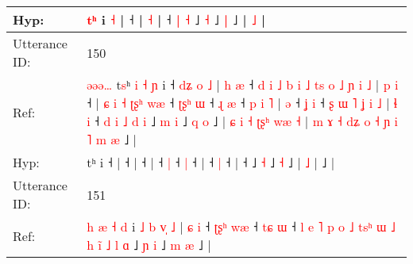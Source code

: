 \documentclass[10pt]{article}
\DeclareRobustCommand{\hl}[1]{{\textcolor{red}{#1}}}
\begin{document}
\begin{longtable}{ll}
Hyp: & \hl{}\hl{}\hl{}\hl{}\hl{}\hl{}\hl{}\hl{}\hl{}\hl{}\hl{}\hl{}\hl{}\hl{t}\hl{ʰ} i \hl{˧} |\hl{}\hl{}\hl{}\hl{} ˧\hl{}\hl{}\hl{}\hl{}\hl{}\hl{} |\hl{}\hl{}\hl{}\hl{}\hl{} \hl{}\hl{˧} |\hl{}\hl{}\hl{}\hl{} ˧ \hl{|} \hl{˧} ˩\hl{}\hl{} \hl{˧} ˩\hl{}\hl{} \hl{|} ˩ |\hl{}\hl{}\hl{}\hl{} \hl{˩} |
 \\
\midrule
Utterance ID: & 150 \\
Ref: & \hl{ə}\hl{ə}\hl{ə}\hl{…}\hl{ }t\hl{s}ʰ\hl{ }\hl{i}\hl{ }\hl{˧}\hl{ }\hl{ɲ} i ˧\hl{ }\hl{d}\hl{ʑ}\hl{ }\hl{o}\hl{ }\hl{˩} |\hl{ }\hl{h}\hl{ }\hl{æ} ˧\hl{ }\hl{d}\hl{ }\hl{i}\hl{ }\hl{˩}\hl{ }\hl{b}\hl{ }\hl{i}\hl{ }\hl{˩}\hl{ }\hl{t}\hl{s}\hl{ }\hl{o}\hl{ }\hl{˩}\hl{ }\hl{ɲ}\hl{ }\hl{i}\hl{ }\hl{˩} |\hl{ }\hl{p}\hl{ }\hl{i} ˧ |\hl{ }\hl{ɕ}\hl{ }\hl{i}\hl{ }\hl{˧}\hl{ }\hl{ʈ}\hl{ʂ}\hl{ʰ}\hl{ }\hl{w}\hl{æ} ˧\hl{ }\hl{ʈ}\hl{ʂ}\hl{ʰ} \hl{ɯ} ˧\hl{ }\hl{ɻ} \hl{æ} ˧\hl{ }\hl{p}\hl{ }\hl{i}\hl{ }\hl{˥} |\hl{ }\hl{ə} ˧\hl{ }\hl{ʝ} \hl{i} ˧\hl{ }\hl{ʂ}\hl{ }\hl{ɯ}\hl{ }\hl{˥}\hl{ }\hl{ʝ}\hl{ }\hl{i}\hl{ }\hl{˩} |\hl{ }\hl{ɬ}\hl{ }\hl{i} ˧\hl{ }\hl{d}\hl{ }\hl{i}\hl{ }\hl{˩}\hl{ }\hl{d}\hl{ }\hl{i} ˩\hl{ }\hl{m} \hl{i} ˩\hl{ }\hl{q} \hl{o} ˩ |\hl{ }\hl{ɕ}\hl{ }\hl{i}\hl{ }\hl{˧}\hl{ }\hl{ʈ}\hl{ʂ}\hl{ʰ}\hl{ }\hl{w}\hl{æ} \hl{˧} |\hl{ }\hl{m}\hl{ }\hl{ɤ}\hl{ }\hl{˧}\hl{ }\hl{d}\hl{ʑ}\hl{ }\hl{o}\hl{ }\hl{˧}\hl{ }\hl{ɲ}\hl{ }\hl{i}\hl{ }\hl{˥}\hl{ }\hl{m}\hl{ }\hl{æ} ˩ |
 \\
Hyp: & \hl{}\hl{}\hl{}\hl{}\hl{}t\hl{}ʰ\hl{}\hl{}\hl{}\hl{}\hl{}\hl{} i ˧\hl{}\hl{}\hl{}\hl{}\hl{}\hl{}\hl{} |\hl{}\hl{}\hl{}\hl{} ˧\hl{}\hl{}\hl{}\hl{}\hl{}\hl{}\hl{}\hl{}\hl{}\hl{}\hl{}\hl{}\hl{}\hl{}\hl{}\hl{}\hl{}\hl{}\hl{}\hl{}\hl{}\hl{}\hl{}\hl{}\hl{} |\hl{}\hl{}\hl{}\hl{} ˧ |\hl{}\hl{}\hl{}\hl{}\hl{}\hl{}\hl{}\hl{}\hl{}\hl{}\hl{}\hl{}\hl{} ˧\hl{}\hl{}\hl{}\hl{} \hl{|} ˧\hl{}\hl{} \hl{|} ˧\hl{}\hl{}\hl{}\hl{}\hl{}\hl{} |\hl{}\hl{} ˧\hl{}\hl{} \hl{|} ˧\hl{}\hl{}\hl{}\hl{}\hl{}\hl{}\hl{}\hl{}\hl{}\hl{}\hl{}\hl{} |\hl{}\hl{}\hl{}\hl{} ˧\hl{}\hl{}\hl{}\hl{}\hl{}\hl{}\hl{}\hl{}\hl{}\hl{} ˩\hl{}\hl{} \hl{˧} ˩\hl{}\hl{} \hl{˧} ˩ |\hl{}\hl{}\hl{}\hl{}\hl{}\hl{}\hl{}\hl{}\hl{}\hl{}\hl{}\hl{}\hl{} \hl{˩} |\hl{}\hl{}\hl{}\hl{}\hl{}\hl{}\hl{}\hl{}\hl{}\hl{}\hl{}\hl{}\hl{}\hl{}\hl{}\hl{}\hl{}\hl{}\hl{}\hl{}\hl{}\hl{}\hl{} ˩ |
 \\
\midrule
Utterance ID: & 151 \\
Ref: & \hl{h}\hl{ }\hl{æ}\hl{ }\hl{˧}\hl{ }\hl{d} i\hl{ }\hl{˩}\hl{ }\hl{b}\hl{ }\hl{v}\hl{̩} \hl{˩} |\hl{ }\hl{ɕ}\hl{ }\hl{i} ˧\hl{ }\hl{ʈ}\hl{ʂ}\hl{ʰ} \hl{w}\hl{æ} ˧\hl{ }\hl{t}\hl{ɕ} \hl{ɯ} ˧\hl{ }\hl{l}\hl{ }\hl{e}\hl{ }\hl{˥}\hl{ }\hl{p}\hl{ }\hl{o}\hl{ }\hl{˩}\hl{ }\hl{t}\hl{s}\hl{ʰ}\hl{ }\hl{ɯ}\hl{ }\hl{˩}\hl{ }\hl{h}\hl{ }\hl{i}\hl{̃}\hl{ }\hl{˩}\hl{ }\hl{l}\hl{ }\hl{ɑ} ˩ \hl{ɲ} \hl{i} ˩\hl{ }\hl{m} \hl{æ} ˩ |

\end{longtable}
\end{document}
